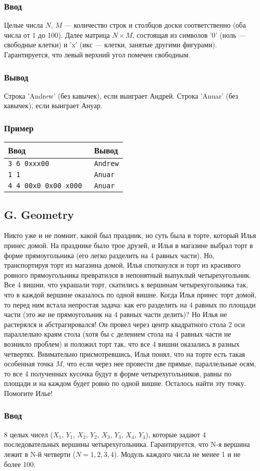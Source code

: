 \documentclass[10pt, a4paper]{article}
\newcommand{\informat}[1]
{
	\subsubsection*{Ввод} #1
}
\newcommand{\outformat}[1]
{
	\subsubsection*{Вывод} #1
}
\newcommand{\exampleee}[6]
{
	\subsubsection*{Пример}
	\noindent
	\begin{center}
	\begin{tabularx}{\linewidth}{|X|X|}
	\hline
	Ввод 	& Вывод  	\\
	\hline
	{\tt #1} & {\tt #2}	\\
	\hline
	{\tt #3} & {\tt #4}	\\
	\hline
	{\tt #5} & {\tt #6}	\\
	\hline
	\end{tabularx}
	\end{center}
}
\begin{document}
\informat{Целые числа $N$, $M$ --- количество строк и столбцов доски соответственно (оба числа от 1 до 100). Далее матрица $N \times M$, состоящая из символов '0' (ноль --- свободные клетки) и 'x' (икс --- клетки, занятые другими фигурами). Гарантируется, что левый верхний угол помечен свободным.}

\outformat{Строка 'Andrew' (без кавычек), если выиграет Андрей. Строка 'Anuar'  (без кавычек), если выиграет Ануар.}

\exampleee{3 6 \newline
000000 \newline
0xxx00 \newline
000000}
{Andrew}
{1 1 \newline 0}
{Anuar}
{4 4 \newline
00x0 \newline
0x00 \newline
x000 \newline
0000}
{Anuar}



\subsection*{G. Geometry}

Никто уже и не помнит, какой был праздник, но суть была в торте, который Илья принес домой. На празднике было трое друзей, и Илья в магазине выбрал торт в форме прямоугольника (его легко разделить на 4 равных части). Но, транспортируя торт из магазина домой, Илья споткнулся и торт из красивого ровного прямоугольника превратился в непонятный выпуклый четырехугольник. Все 4 вишни, что украшали торт, скатились к вершинам четырехугольника так, что в каждой вершине оказалось по одной вишне. Когда Илья принес торт домой, то перед ним встала непростая задача: как его разделить на 4 равных по площади части (это же не прямоугольник на 4 равных части делить)? Но Илья не растерялся и абстрагировался! Он провел через центр квадратного стола 2 оси параллельно краям стола (хотя бы с делением стола на 4 равных части не возникло проблем) и положил торт так, что все 4 вишни оказались в разных четвертях. Внимательно присмотревшись, Илья понял, что на торте есть такая особенная точка $M$, что если через нее провести две прямые, параллельные осям, то все 4 полученных кусочка будут в форме четырехугольников, равны по площади и на каждом будет ровно по одной вишне. Осталось найти эту точку. Помогите Илье!

\informat{8 целых чисел ($X_1$, $Y_1$, $X_2$, $Y_2$, $X_3$, $Y_3$, $X_4$, $Y_4$), которые задают 4 последовательных вершины четырехугольника. Гарантируется, что N-я вершина лежит в N-й четверти ($N=1, 2, 3, 4$). Модуль каждого числа не менее 1 и не более 100.}
\end{document}
